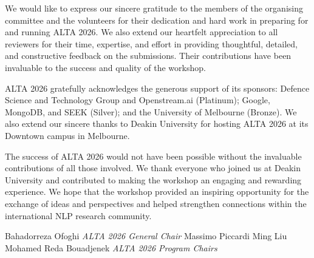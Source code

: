 We would like to express our sincere gratitude to the members of the organising committee and the volunteers for their dedication and hard work in preparing for and running ALTA 2026. We also extend our heartfelt appreciation to all reviewers for their time, expertise, and effort in providing thoughtful, detailed, and constructive feedback on the submissions. Their contributions have been invaluable to the success and quality of the workshop. \newline


ALTA 2026 gratefully acknowledges the generous support of its sponsors: Defence Science and Technology Group and Openstream.ai (Platinum); Google, MongoDB, and SEEK (Silver); and the University of Melbourne (Bronze). We also extend our sincere thanks to Deakin University for hosting ALTA 2026 at its Downtown campus in Melbourne. \newline


The success of ALTA 2026 would not have been possible without the invaluable contributions of all those involved. We thank everyone who joined us at Deakin University and contributed to making the workshop an engaging and rewarding experience. We hope that the workshop provided an inspiring opportunity for the exchange of ideas and perspectives and helped strengthen connections within the international NLP research community. \newline


\hspace*{\fill}Bahadorreza Ofoghi\newline
\hspace*{\fill}\textit{ALTA 2026 General Chair}\newline\newline
\hspace*{\fill}Massimo Piccardi\newline
\hspace*{\fill}Ming Liu\newline
\hspace*{\fill}Mohamed Reda Bouadjenek\newline
\hspace*{\fill}\textit{ALTA 2026 Program Chairs}